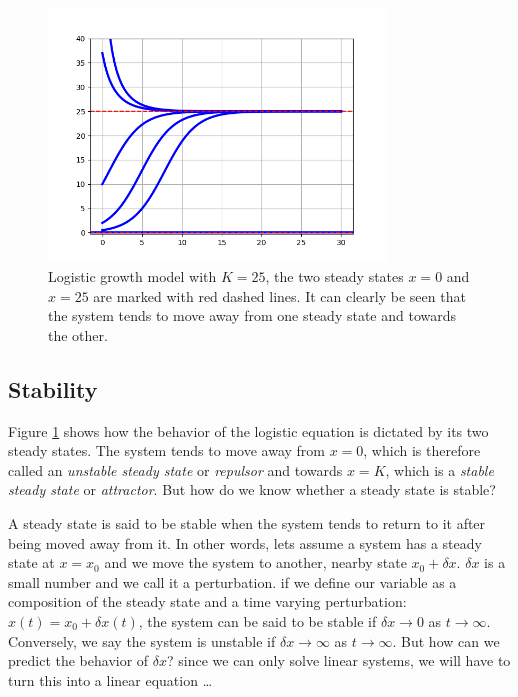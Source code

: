 \documentclass{tufte-book} %
\begin{document}
\begin{figure}
	\begin{center}
		\includegraphics[width=0.8\textwidth]{logisticall}
	\end{center}
	\caption{Logistic growth model with $K=25$, the two steady states $x=0$ and $x=25$ are marked with red dashed lines. It can clearly be seen that the system tends to move away from one steady state and towards the other.}
	\label{fig:logisticall}
\end{figure}

\subsection{Stability}

Figure \ref{fig:logisticall} shows how the behavior of the logistic equation is dictated by its two steady states. The system tends to move away from $x=0$, which is therefore called an \emph{unstable steady state} or \emph{repulsor} and towards $x=K$, which is a \emph{stable steady state} or \emph{attractor}. But how do we know whether a steady state is stable?

A steady state is said to be stable when the system tends to return to it after being moved away from it. In other words, lets assume a system has a steady state at $x=x_0$ and we move the system to another, nearby state $x_0+\delta x$. $\delta x$ is a small number and we call it a perturbation. if we define our variable as a composition of the steady state and a time varying perturbation: $x(t) = x_0 + \delta x(t)$, the system can be said to be stable if $\delta x \rightarrow 0$ as $t \rightarrow \infty$. Conversely, we say the system is unstable if $\delta x \rightarrow \infty$ as $t \rightarrow \infty$.  But how can we predict the behavior of $\delta x$? since we can only solve linear systems, we will have to turn this into a linear equation \dots
\end{document}
